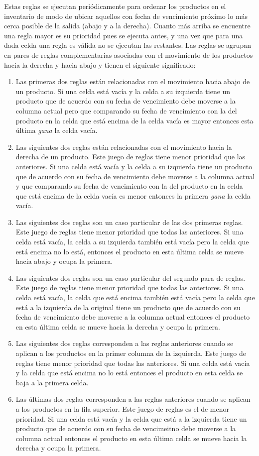 \documentclass[10pt]{article}
\begin{document}
Estas reglas se ejecutan periódicamente para ordenar los productos en el inventario de modo de ubicar aquellos con fecha de vencimiento próximo lo más cerca posible de la salida (abajo y a la derecha). Cuanto más arriba se encuentre una regla mayor es su prioridad pues se ejecuta antes, y una vez que para una dada celda una regla es válida no se ejecutan las restantes. Las reglas se agrupan en pares de reglas complementarias asociadas con el movimiento de los productos hacia la derecha y hacia abajo y tienen el siguiente significado:
\begin{enumerate}
	\item Las primeras dos reglas están relacionadas con el movimiento hacia abajo de un producto. Si una celda está vacía y la celda a su izquierda tiene un producto que de acuerdo con su fecha de vencimiento debe moverse a la columna actual pero que comparando su fecha de vencimiento con la del producto en la celda que está encima de la celda vacía es mayor entonces esta última \textit{gana} la celda vacía.
	\item Las siguientes dos reglas están relacionadas con el movimiento hacia la derecha de un producto. Este juego de reglas tiene menor prioridad que las anteriores. Si una celda está vacía y la celda a su izquierda tiene un producto que de acuerdo con su fecha de vencimiento debe moverse a la columna actual y que comparando su fecha de vencimiento con la del producto en la celda que está encima de la celda vacía es menor entonces la primera \textit{gana} la celda vacía. 
	\item Las siguientes dos reglas son un caso particular de las dos primeras reglas. Este juego de reglas tiene menor prioridad que todas las anteriores. Si una celda está vacía, la celda a su izquierda también está vacía pero la celda que está encima no lo está, entonces el producto en esta última celda se mueve hacia abajo y ocupa la primera.
	\item Las siguientes dos reglas son un caso particular del segundo para de reglas. Este juego de reglas tiene menor prioridad que todas las anteriores. Si una celda está vacía, la celda que está encima también está vacía pero la celda que está a la izquierda de la original tiene un producto que de acuerdo con su fecha de vencimiento debe moverse a la columna actual entonces el producto en esta última celda se mueve hacia la derecha y ocupa la primera.
	\item Las siguientes dos reglas corresponden a las reglas anteriores cuando se aplican a los productos en la primer columna de la izquierda. Este juego de reglas tiene menor prioridad que todas las anteriores. Si una celda está vacía y la celda que está encima no lo está entonces el producto en esta celda se baja a la primera celda.
	\item Las últimas dos reglas corresponden a las reglas anteriores cuando se aplican a los productos en la fila superior. Este juego de reglas es el de menor prioridad. Si una celda está vacía y la celda que está a la izquierda tiene un producto que de acuerdo con su fecha de vencimeitno debe moverse a la columna actual entonces el producto en esta última celda se mueve hacia la derecha y ocupa la primera.
\end{enumerate}
\end{document}
